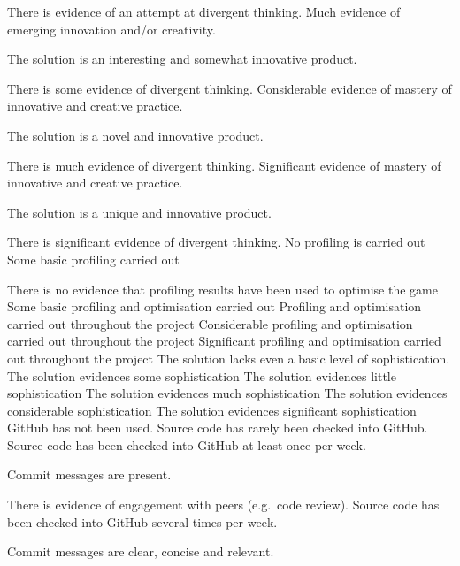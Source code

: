 \documentclass{../../fal_assignment}
\begin{document}
\begin{markingrubric}
            \par There is evidence of an attempt at divergent thinking.
        \grade Much evidence of emerging innovation and/or creativity.
            \par The solution is an interesting and somewhat innovative product.
            \par There is some evidence of divergent thinking.
        \grade Considerable evidence of mastery of innovative and creative practice.
            \par The solution is a novel and innovative product.
            \par There is much evidence of divergent thinking.
        \grade Significant evidence of mastery of innovative and creative practice.
            \par The solution is a unique and innovative product.
            \par There is significant evidence of divergent thinking.
%            
        \grade\fail No profiling is carried out
        \grade Some basic profiling carried out
            \par There is no evidence that profiling results have been used to optimise the game 
        \grade Some basic profiling and optimisation carried out
        \grade Profiling and optimisation carried out throughout the project
        \grade Considerable profiling and optimisation carried out throughout the project
        \grade Significant profiling and optimisation carried out throughout the project
%
        \grade\fail The solution lacks even a basic level of sophistication.
        \grade The solution evidences some sophistication
        \grade The solution evidences little sophistication
        \grade The solution evidences much sophistication 
        \grade The solution evidences considerable sophistication
        \grade The solution evidences significant sophistication
%            
        \grade\fail GitHub has not been used.
        \grade Source code has rarely been checked into GitHub.
        \grade Source code  has been checked into GitHub at least once per week.
            \par Commit messages are present.
            \par There is evidence of engagement with peers (e.g.\ code review).
        \grade Source code  has been checked into GitHub several times per week.
            \par Commit messages are clear, concise and relevant.

\end{markingrubric}
\end{document}
